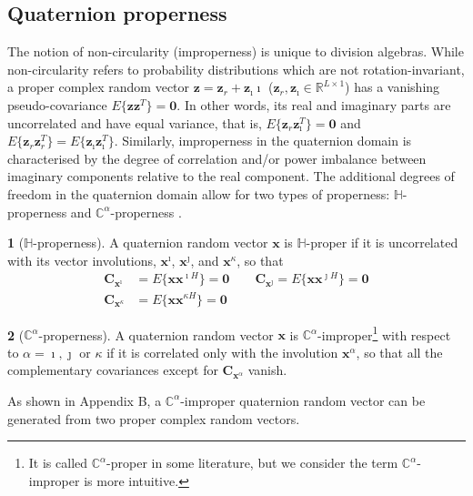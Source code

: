 \documentclass[review]{elsarticle}
\theoremstyle{plain}
\theoremstyle{remark}
\theoremstyle{plain}
\theoremstyle{definition}
\newtheorem{defn}{\protect\definitionname}
\theoremstyle{prop}
\theoremstyle{definition}
\theoremstyle{plain}
\theoremstyle{plain}
\providecommand{\definitionname}{Definition}
\begin{document}
\subsection{Quaternion properness}
The notion of non-circularity (improperness) is unique to division algebras. While non-circularity refers to probability distributions which are not rotation-invariant, a proper complex random vector $\mathbf{z}=\mathbf{z}_r+\mathbf{z}_\imath\imath$ ($\mathbf{z}_r, \mathbf{z}_\imath \in \mathbb{R}^{L\times1}$) has a vanishing pseudo-covariance $E\{\mathbf{z}\mathbf{z}^T\}=\mathbf{0}$. In other words, its real and imaginary parts are uncorrelated and have equal variance, that is, $E\{\mathbf{z}_r\mathbf{z}_\imath^T\}=\mathbf{0}$ and $E\{\mathbf{z}_r\mathbf{z}_r^T\}=E\{\mathbf{z}_\imath\mathbf{z}_\imath^T\}$. Similarly, improperness in the quaternion domain is characterised by the degree of correlation and/or power imbalance between imaginary components relative to the real component. The additional degrees of freedom in the quaternion domain allow for two types of properness: $\mathbb{H}$-properness and $\mathbb{C}^\alpha$-properness \cite{Amblard2004}.
\begin{defn}[$\mathbb{H}$-properness]
A quaternion random vector $\mathbf{x}$ is $\mathbb{H}$-proper if it is uncorrelated with its vector involutions, $\mathbf{x}^\imath$, $\mathbf{x}^\jmath$, and $\mathbf{x}^\kappa$, so that
\begin{equation}
\begin{split}
\mathbf{C}_{\mathbf{x}^\imath}&=E\{\mathbf{x}\mathbf{x}^{\imath H}\}=\mathbf{0} \quad \quad
\mathbf{C}_{\mathbf{x}^\jmath}=E\{\mathbf{x}\mathbf{x}^{\jmath H}\}=\mathbf{0} \\
\mathbf{C}_{\mathbf{x}^\kappa}&=E\{\mathbf{x}\mathbf{x}^{\kappa H}\}=\mathbf{0}
\end{split}
\end{equation}
\end{defn}
\begin{defn}[$\mathbb{C}^\alpha$-properness]
A quaternion random vector $\mathbf{x}$ is $\mathbb{C}^\alpha$-improper\footnote{It is called $\mathbb{C}^\alpha$-proper in some literature, but we consider the term $\mathbb{C}^\alpha$-improper is more intuitive.} with respect to $\alpha=\imath,\jmath$ or $\kappa$ if it is correlated only with the involution $\mathbf{x}^\alpha$, so that all the complementary covariances except for $\mathbf{C}_{\mathbf{x}^\alpha}$ vanish.
\end{defn}
As shown in Appendix B, a $\mathbb{C}^\alpha$-improper quaternion random vector can be generated from two proper complex random vectors.
\end{document}
